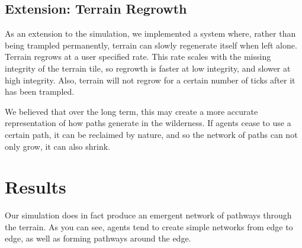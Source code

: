\documentclass[conference]{IEEEtran}
\begin{document}
\subsection{Extension: Terrain Regrowth}
As an extension to the simulation, we implemented a system where, rather than being trampled permanently, terrain can slowly regenerate itself when left alone. Terrain regrows at a user specified rate. This rate scales with the missing integrity of the terrain tile, so regrowth is faster at low integrity, and slower at high integrity. Also, terrain will not regrow for a certain number of ticks after it has been trampled.

We believed that over the long term, this may create a more accurate representation of how paths generate in the wilderness. If agents cease to use a certain path, it can be reclaimed by nature, and so the network of paths can not only grow, it can also shrink.

\section{Results}
Our simulation does in fact produce an emergent network of pathways through the terrain. As you can see, agents tend to create simple networks from edge to edge, as well as forming pathways around the edge. 
\end{document}
